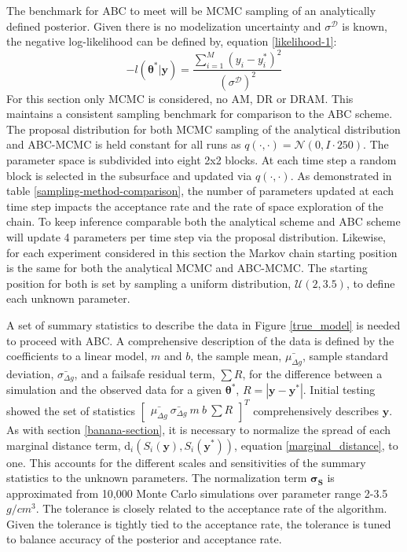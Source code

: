 The benchmark for ABC to meet will be MCMC sampling of an analytically defined posterior. Given there is no modelization uncertainty and $\sigma^{\mathcal{D}}$ is known, the negative log-likelihood can be defined by, equation \ref{likelihood-1}:
\begin{equation}
	-l(\bm{\theta^*}|\bm{y}) = \frac{\sum_{i = 1}^{M}(y_i-y^*_i)^2}{(\sigma^{\mathcal{D}})^2}
	\label{analytical-applied-likelihood}
\end{equation}
For this section only MCMC is considered, no AM, DR or DRAM. This maintains a consistent sampling benchmark for comparison to the ABC scheme. The proposal distribution for both MCMC sampling of the analytical distribution and ABC-MCMC is held constant for all runs as $q(\cdot,\cdot) = \mathcal{N}(0,I\cdot250)$. The parameter space is subdivided into eight 2x2 blocks. At each time step a random block is selected in the subsurface and updated via $q(\cdot,\cdot)$. As demonstrated in table \ref{sampling-method-comparison}, the number of parameters updated at each time step impacts the acceptance rate and the rate of space exploration of the chain. To keep inference comparable both the analytical scheme and ABC scheme will update 4 parameters per time step via the proposal distribution. Likewise, for each experiment considered in this section the Markov chain starting position is the same for both the analytical MCMC and ABC-MCMC. The starting position for both is set by sampling a uniform distribution, $\mathcal{U}(2,3.5)$, to define each unknown parameter. \par

A set of summary statistics to describe the data in Figure \ref{true_model} is needed to proceed with ABC. A comprehensive description of the data is defined by the coefficients to a linear model, $m$ and $b$, the sample mean, $\bar{\mu_{\Delta g}}$, sample standard deviation, $\bar{\sigma_{\Delta g}}$, and a failsafe residual term, $\sum R$, for the difference between a simulation and the observed data for a given $\bm{\theta^*}$, $R = |\bm{y}-\bm{y^*}|$. Initial testing showed the set of statistics $\begin{bmatrix}
\bar{\mu_{\Delta g}}\ \bar{\sigma_{\Delta g}}\ m\ b\ \sum R
\end{bmatrix}^T$ comprehensively describes $\bm{y}$. As with section \ref{banana-section}, it is necessary to normalize the spread of each marginal distance term, $\text{d}_i(S_i(\bm{y}),S_i(\bm{y^*}))$, equation \ref{marginal_distance}, to one. This accounts for the different scales and sensitivities of the summary statistics to the unknown parameters. The normalization term $\bm{\sigma_S}$ is approximated from 10,000 Monte Carlo simulations over parameter range 2-3.5 $g/cm^3$. The tolerance is closely related to the acceptance rate of the algorithm. Given the tolerance is tightly tied to the acceptance rate, the tolerance is tuned to balance accuracy of the posterior and acceptance rate.\par

